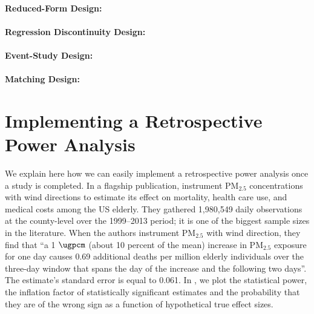 \documentclass[12pt]{article}
\begin{document}
\paragraph{Reduced-Form Design:} \cite{bauernschuster_when_2017, jans_economic_2018, jia_is_2019, godzinski2019short}

\paragraph{Regression Discontinuity Design:} \cite{chen_air_2018, fan_winter_2020, anderson2022bounds}

\paragraph{Event-Study Design:} \cite{mullins_effects_2015, simeonova_congestion_2021}

\paragraph{Matching Design:} \cite{baccini_assessing_2017, forastiere_assessing_2020}



\section{Implementing a Retrospective Power Analysis} \label{retro_example}

We explain here how we can easily implement a retrospective power analysis once a study is completed. In a flagship publication, \cite{deryugina_mortality_2019} instrument PM$_{2.5}$ concentrations with wind directions to estimate its effect on mortality, health care use, and medical costs among the US elderly. They gathered 1,980,549 daily observations at the county-level over the 1999–2013 period; it is one of the biggest sample sizes in the literature. When the authors instrument PM$_{2.5}$ with wind direction, they find that “a 1 $\si{\ugpcm}$ (about 10 percent of the mean) increase in PM$_{2.5}$ exposure for one day causes 0.69 additional deaths per million elderly individuals over the three-day window that spans the day of the increase and the following two days”. The estimate's standard error is equal to 0.061. In , we plot the statistical power, the inflation factor of statistically significant estimates and the probability that they are of the wrong sign as a function of hypothetical true effect sizes.
    
\end{document}
